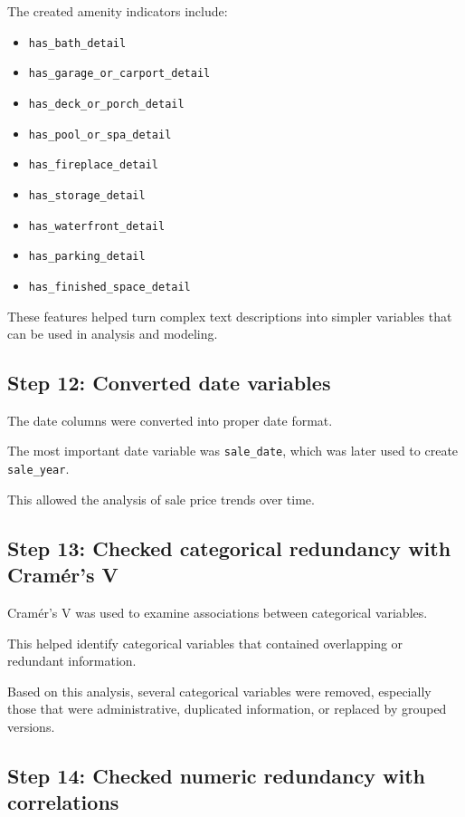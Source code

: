 \documentclass[
  english,
  letterpaper,
  DIV=11,
  numbers=noendperiod]{scrreprt}
\begin{document}
The created amenity indicators include:

\begin{itemize}
\item
  \texttt{has\_bath\_detail}
\item
  \texttt{has\_garage\_or\_carport\_detail}
\item
  \texttt{has\_deck\_or\_porch\_detail}
\item
  \texttt{has\_pool\_or\_spa\_detail}
\item
  \texttt{has\_fireplace\_detail}
\item
  \texttt{has\_storage\_detail}
\item
  \texttt{has\_waterfront\_detail}
\item
  \texttt{has\_parking\_detail}
\item
  \texttt{has\_finished\_space\_detail}
\end{itemize}

These features helped turn complex text descriptions into simpler
variables that can be used in analysis and modeling.

\subsection{Step 12: Converted date
variables}\label{step-12-converted-date-variables}

The date columns were converted into proper date format.

The most important date variable was \texttt{sale\_date}, which was
later used to create \texttt{sale\_year}.

This allowed the analysis of sale price trends over time.

\subsection{Step 13: Checked categorical redundancy with Cramér's
V}\label{step-13-checked-categorical-redundancy-with-cramuxe9rs-v}

Cramér's V was used to examine associations between categorical
variables.

This helped identify categorical variables that contained overlapping or
redundant information.

Based on this analysis, several categorical variables were removed,
especially those that were administrative, duplicated information, or
replaced by grouped versions.

\subsection{Step 14: Checked numeric redundancy with
correlations}\label{step-14-checked-numeric-redundancy-with-correlations}
\end{document}
